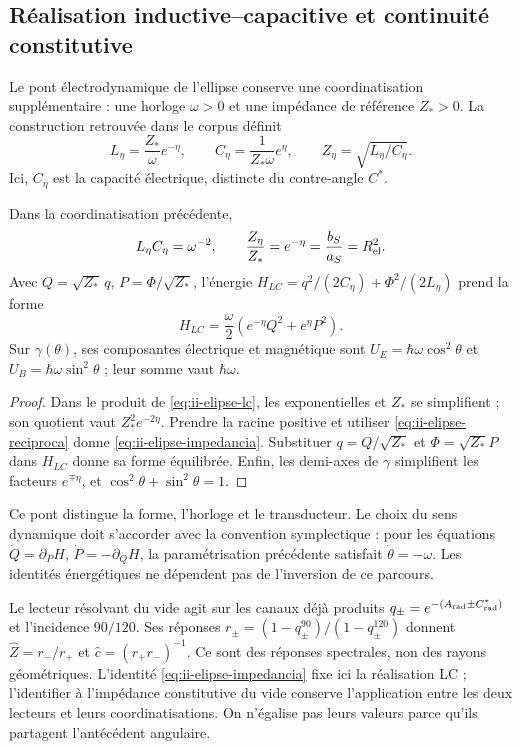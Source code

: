 \subsection{Réalisation inductive--capacitive et continuité constitutive}
\label{sec:ii-elipse-lc}

Le pont électrodynamique de l’ellipse conserve une coordinatisation supplémentaire :
une horloge \(\omega>0\) et une impédance de référence \(Z_*>0\).
La construction retrouvée dans le corpus définit
\begin{equation}
 L_\eta=\frac{Z_*}{\omega}e^{-\eta},\qquad
 C_\eta=\frac{1}{Z_*\omega}e^\eta,
 \qquad Z_\eta=\sqrt{L_\eta/C_\eta}.
 \label{eq:ii-elipse-lc}
\end{equation}
Ici, \(C_\eta\) est la capacité électrique, distincte du contre-angle \(C^*\).
\begin{proposition}
\label{prop:ii-elipse-lc}
Dans la coordinatisation précédente,
\begin{equation}
 L_\eta C_\eta=\omega^{-2},\qquad
 \frac{Z_\eta}{Z_*}=e^{-\eta}
 =\frac{b_S}{a_S}=R_{\rm el}^{2}.
 \label{eq:ii-elipse-impedancia}
\end{equation}
Avec \(Q=\sqrt{Z_*}\,q\), \(P=\Phi/\sqrt{Z_*}\), l'énergie
\(H_{LC}=q^2/(2C_\eta)+\Phi^2/(2L_\eta)\) prend la forme
\[
 H_{LC}=\frac\omega2(e^{-\eta}Q^2+e^\eta P^2).
\]
Sur \(\gamma(\theta)\), ses composantes électrique et magnétique sont
\(U_E=\hbar\omega\cos^2\theta\) et
\(U_B=\hbar\omega\sin^2\theta\) ; leur somme vaut \(\hbar\omega\).
\end{proposition}
\begin{proof}
Dans le produit de \eqref{eq:ii-elipse-lc}, les exponentielles et
\(Z_*\) se simplifient ; son quotient vaut \(Z_*^2e^{-2\eta}\). Prendre la racine
positive et utiliser \eqref{eq:ii-elipse-reciproca} donne
\eqref{eq:ii-elipse-impedancia}. Substituer \(q=Q/\sqrt{Z_*}\)
et \(\Phi=\sqrt{Z_*}P\) dans \(H_{LC}\) donne sa forme équilibrée.
Enfin, les demi-axes de \(\gamma\) simplifient les facteurs
\(e^{\mp\eta}\), et \(\cos^2\theta+\sin^2\theta=1\).
\end{proof}

Ce pont distingue la forme, l'horloge et le transducteur. Le choix
du sens dynamique doit s'accorder avec la convention symplectique : pour
les équations \(\dot Q=\partial_PH\),
\(\dot P=-\partial_QH\), la paramétrisation précédente satisfait
\(\dot\theta=-\omega\). Les identités énergétiques ne dépendent pas
de l'inversion de ce parcours.

Le lecteur résolvant du vide agit sur les canaux déjà produits
\(q_\pm=e^{-(A_{\rm rad}\pm C^*_{\rm rad})}\) et l’incidence
\(90/120\). Ses réponses
\(r_\pm=(1-q_\pm^{90})/(1-q_\pm^{120})\) donnent
\(\widehat Z=r_-/r_+\) et \(\widehat c=(r_+r_-)^{-1}\).
Ce sont des réponses spectrales, non des rayons géométriques. L’identité
\eqref{eq:ii-elipse-impedancia} fixe ici la réalisation LC ;
l’identifier à l’impédance constitutive du vide conserve l’application
entre les deux lecteurs et leurs coordinatisations. On n’égalise pas leurs valeurs parce qu’ils partagent
l’antécédent angulaire.
